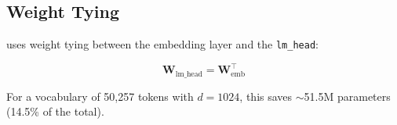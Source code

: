 \subsection{Weight Tying}

\aletheion{} uses weight tying between the embedding layer and the
\texttt{lm\_head}:

\begin{equation}
    \bm{W}_{\text{lm\_head}} = \bm{W}_{\text{emb}}^\top
\end{equation}

For a vocabulary of 50,257 tokens with $d = 1024$, this saves
$\sim$51.5M parameters (14.5\% of the total).
